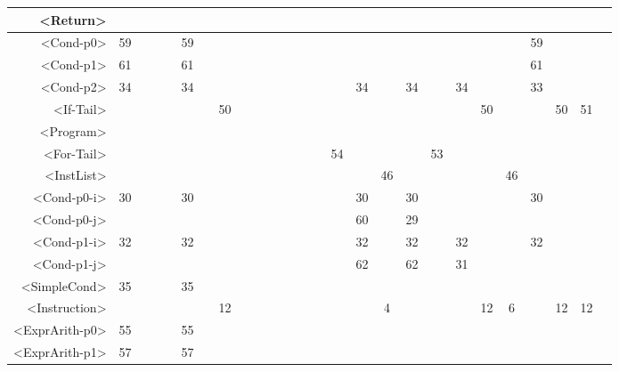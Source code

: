 \begin{tabular}{r|c@{ }c@{ }c@{ }c@{ }c@{ }c@{ }c@{ }c@{ }c@{ }c@{ }c@{ }c@{ }c@{ }c@{ }c@{ }c@{ }c@{ }c@{ }c@{ }c@{ }c@{ }c@{ }c@{ }c@{ }c@{ }c@{ }}
<Return> &   &   &   &   &   &   &   &   &   &   &   &   &   &   &   &   &   &   &   &   &   &   &   &   &   &   \\\hline
<Cond-p0> & 59 &   &   &   & 59 &   &   &   &   &   &   &   &   &   &   &   &   &   &   &   &   &   & 59 &   &   &   \\\hline
<Cond-p1> & 61 &   &   &   & 61 &   &   &   &   &   &   &   &   &   &   &   &   &   &   &   &   &   & 61 &   &   &   \\\hline
<Cond-p2> & 34 &   &   &   & 34 &   &   &   &   &   &   &   &   &   &   & 34 &   & 34 &   & 34 &   &   & 33 &   &   &   \\\hline
<If-Tail> &   &   &   &   &   &   & 50 &   &   &   &   &   &   &   &   &   &   &   &   &   & 50 &   &   & 50 & 51 &   \\\hline
<Program> &   &   &   &   &   &   &   &   &   &   &   &   &   &   &   &   &   &   &   &   &   &   &   &   &   &   \\\hline
<For-Tail> &   &   &   &   &   &   &   &   &   &   &   &   &   &   & 54 &   &   &   & 53 &   &   &   &   &   &   &   \\\hline
<InstList> &   &   &   &   &   &   &   &   &   &   &   &   &   &   &   &   & 46 &   &   &   &   & 46 &   &   &   &   \\\hline
<Cond-p0-i> & 30 &   &   &   & 30 &   &   &   &   &   &   &   &   &   &   & 30 &   & 30 &   &   &   &   & 30 &   &   &   \\\hline
<Cond-p0-j> &   &   &   &   &   &   &   &   &   &   &   &   &   &   &   & 60 &   & 29 &   &   &   &   &   &   &   &   \\\hline
<Cond-p1-i> & 32 &   &   &   & 32 &   &   &   &   &   &   &   &   &   &   & 32 &   & 32 &   & 32 &   &   & 32 &   &   &   \\\hline
<Cond-p1-j> &   &   &   &   &   &   &   &   &   &   &   &   &   &   &   & 62 &   & 62 &   & 31 &   &   &   &   &   &   \\\hline
<SimpleCond> & 35 &   &   &   & 35 &   &   &   &   &   &   &   &   &   &   &   &   &   &   &   &   &   &   &   &   &   \\\hline
<Instruction> &   &   &   &   &   &   & 12 &   &   &   &   &   &   &   &   &   & 4 &   &   &   & 12 & 6 &   & 12 & 12 &   \\\hline
<ExprArith-p0> & 55 &   &   &   & 55 &   &   &   &   &   &   &   &   &   &   &   &   &   &   &   &   &   &   &   &   &   \\\hline
<ExprArith-p1> & 57 &   &   &   & 57 &   &   &   &   &   &   &   &   &   &   &   &   &   &   &   &   &   &   &   &   &   \\\hline

\end{tabular}
